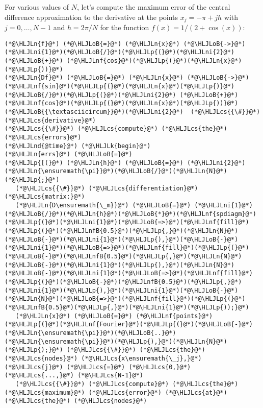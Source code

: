 \documentclass[12pt,a4paper]{article}
\newcommand{\HLJLk}[1]{\textcolor[RGB]{148,91,176}{\textbf{#1}}}
\newcommand{\HLJLn}[1]{#1}
\newcommand{\HLJLnd}[1]{\textcolor[RGB]{214,102,97}{#1}}
\newcommand{\HLJLnf}[1]{\textcolor[RGB]{66,102,213}{#1}}
\newcommand{\HLJLnfB}[1]{\textcolor[RGB]{59,151,46}{#1}}
\newcommand{\HLJLni}[1]{\textcolor[RGB]{59,151,46}{#1}}
\newcommand{\HLJLoB}[1]{\textcolor[RGB]{102,102,102}{\textbf{#1}}}
\newcommand{\HLJLp}[1]{#1}
\newcommand{\HLJLcs}[1]{\textcolor[RGB]{153,153,119}{\textit{#1}}}
\begin{document}
For various values of $N$, let's compute the maximum error of the central difference approximation to the derivative at the points $x_j = -\pi + jh$ with $j = 0, \ldots, N-1$ and $h = 2\pi/N$ for the function $f(x) = 1/(2 + \cos(x))$:


\begin{lstlisting}
(*@\HLJLn{f}@*) (*@\HLJLoB{=}@*) (*@\HLJLn{x}@*) (*@\HLJLoB{->}@*) (*@\HLJLni{1}@*)(*@\HLJLoB{/}@*)(*@\HLJLp{(}@*)(*@\HLJLni{2}@*) (*@\HLJLoB{+}@*) (*@\HLJLnf{cos}@*)(*@\HLJLp{(}@*)(*@\HLJLn{x}@*)(*@\HLJLp{))}@*)
(*@\HLJLn{Df}@*) (*@\HLJLoB{=}@*) (*@\HLJLn{x}@*) (*@\HLJLoB{->}@*) (*@\HLJLnf{sin}@*)(*@\HLJLp{(}@*)(*@\HLJLn{x}@*)(*@\HLJLp{)}@*)(*@\HLJLoB{/}@*)(*@\HLJLp{(}@*)(*@\HLJLni{2}@*) (*@\HLJLoB{+}@*) (*@\HLJLnf{cos}@*)(*@\HLJLp{(}@*)(*@\HLJLn{x}@*)(*@\HLJLp{))}@*)(*@\HLJLoB{{\textasciicircum}}@*)(*@\HLJLni{2}@*)  (*@\HLJLcs{{\#}}@*) (*@\HLJLcs{derivative}@*)
(*@\HLJLcs{{\#}}@*) (*@\HLJLcs{compute}@*) (*@\HLJLcs{the}@*) (*@\HLJLcs{errors}@*)
(*@\HLJLnd{@time}@*) (*@\HLJLk{begin}@*)
(*@\HLJLn{errs}@*) (*@\HLJLoB{=}@*) 
(*@\HLJLp{[(}@*) (*@\HLJLn{h}@*) (*@\HLJLoB{=}@*) (*@\HLJLni{2}@*)(*@\HLJLn{\ensuremath{\pi}}@*)(*@\HLJLoB{/}@*)(*@\HLJLn{N}@*)(*@\HLJLp{;}@*)
   (*@\HLJLcs{{\#}}@*) (*@\HLJLcs{differentiation}@*) (*@\HLJLcs{matrix:}@*)
   (*@\HLJLn{D\ensuremath{\_m}}@*) (*@\HLJLoB{=}@*) (*@\HLJLni{1}@*)(*@\HLJLoB{/}@*)(*@\HLJLn{h}@*)(*@\HLJLoB{*}@*)(*@\HLJLnf{spdiagm}@*)(*@\HLJLp{(}@*)(*@\HLJLni{1}@*)(*@\HLJLoB{=>}@*)(*@\HLJLnf{fill}@*)(*@\HLJLp{(}@*)(*@\HLJLnfB{0.5}@*)(*@\HLJLp{,}@*)(*@\HLJLn{N}@*)(*@\HLJLoB{-}@*)(*@\HLJLni{1}@*)(*@\HLJLp{),}@*)(*@\HLJLoB{-}@*)(*@\HLJLni{1}@*)(*@\HLJLoB{=>}@*)(*@\HLJLnf{fill}@*)(*@\HLJLp{(}@*)(*@\HLJLoB{-}@*)(*@\HLJLnfB{0.5}@*)(*@\HLJLp{,}@*)(*@\HLJLn{N}@*)(*@\HLJLoB{-}@*)(*@\HLJLni{1}@*)(*@\HLJLp{),}@*)(*@\HLJLn{N}@*)(*@\HLJLoB{-}@*)(*@\HLJLni{1}@*)(*@\HLJLoB{=>}@*)(*@\HLJLnf{fill}@*)(*@\HLJLp{(}@*)(*@\HLJLoB{-}@*)(*@\HLJLnfB{0.5}@*)(*@\HLJLp{,}@*)(*@\HLJLni{1}@*)(*@\HLJLp{),}@*)(*@\HLJLni{1}@*)(*@\HLJLoB{-}@*)(*@\HLJLn{N}@*)(*@\HLJLoB{=>}@*)(*@\HLJLnf{fill}@*)(*@\HLJLp{(}@*)(*@\HLJLnfB{0.5}@*)(*@\HLJLp{,}@*)(*@\HLJLni{1}@*)(*@\HLJLp{));}@*)
   (*@\HLJLn{x}@*) (*@\HLJLoB{=}@*) (*@\HLJLnf{points}@*)(*@\HLJLp{(}@*)(*@\HLJLnf{Fourier}@*)(*@\HLJLp{(}@*)(*@\HLJLoB{-}@*)(*@\HLJLn{\ensuremath{\pi}}@*)(*@\HLJLoB{..}@*)(*@\HLJLn{\ensuremath{\pi}}@*)(*@\HLJLp{),}@*)(*@\HLJLn{N}@*)(*@\HLJLp{);}@*) (*@\HLJLcs{{\#}}@*) (*@\HLJLcs{the}@*) (*@\HLJLcs{nodes}@*) (*@\HLJLcs{x\ensuremath{\_j},}@*) (*@\HLJLcs{j}@*) (*@\HLJLcs{=}@*) (*@\HLJLcs{0,}@*) (*@\HLJLcs{...,}@*) (*@\HLJLcs{N-1}@*)
   (*@\HLJLcs{{\#}}@*) (*@\HLJLcs{compute}@*) (*@\HLJLcs{the}@*) (*@\HLJLcs{maximum}@*) (*@\HLJLcs{error}@*) (*@\HLJLcs{at}@*) (*@\HLJLcs{the}@*) (*@\HLJLcs{nodes}@*)

\end{lstlisting}
\end{document}
